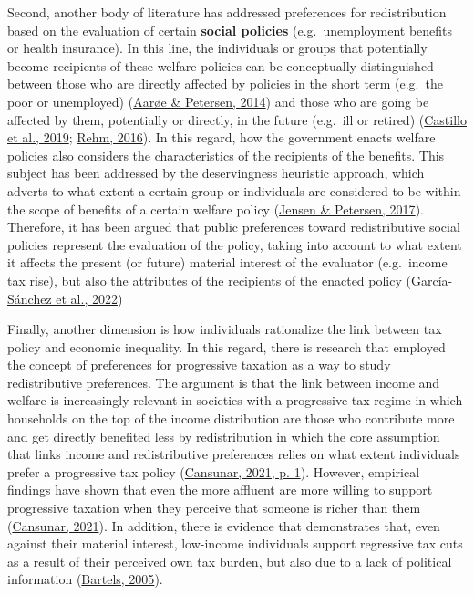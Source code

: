 \documentclass[
  12pt,
]{book}
\begin{document}
Second, another body of literature has addressed preferences for redistribution based on the evaluation of certain \textbf{social policies} (e.g.~unemployment benefits or health insurance). In this line, the individuals or groups that potentially become recipients of these welfare policies can be conceptually distinguished between those who are directly affected by policies in the short term (e.g.~the poor or unemployed) (\protect\hyperlink{ref-Aaroe2014}{Aarøe \& Petersen, 2014}) and those who are going be affected by them, potentially or directly, in the future (e.g.~ill or retired) (\protect\hyperlink{ref-castillo_deserving_2019}{Castillo et al., 2019}; \protect\hyperlink{ref-rehm_risk_2016}{Rehm, 2016}). In this regard, how the government enacts welfare policies also considers the characteristics of the recipients of the benefits. This subject has been addressed by the deservingness heuristic approach, which adverts to what extent a certain group or individuals are considered to be within the scope of benefits of a certain welfare policy (\protect\hyperlink{ref-Jensen2017}{Jensen \& Petersen, 2017}). Therefore, it has been argued that public preferences toward redistributive social policies represent the evaluation of the policy, taking into account to what extent it affects the present (or future) material interest of the evaluator (e.g.~income tax rise), but also the attributes of the recipients of the enacted policy (\protect\hyperlink{ref-garcia-sanchez_two_2022}{García-Sánchez et al., 2022})

Finally, another dimension is how individuals rationalize the link between tax policy and economic inequality. In this regard, there is research that employed the concept of preferences for progressive taxation as a way to study redistributive preferences. The argument is that the link between income and welfare is increasingly relevant in societies with a progressive tax regime in which households on the top of the income distribution are those who contribute more and get directly benefited less by redistribution in which the core assumption that links income and redistributive preferences relies on what extent individuals prefer a progressive tax policy (\protect\hyperlink{ref-cansunar_who_2021}{Cansunar, 2021, p. 1}). However, empirical findings have shown that even the more affluent are more willing to support progressive taxation when they perceive that someone is richer than them (\protect\hyperlink{ref-cansunar_who_2021}{Cansunar, 2021}). In addition, there is evidence that demonstrates that, even against their material interest, low-income individuals support regressive tax cuts as a result of their perceived own tax burden, but also due to a lack of political information (\protect\hyperlink{ref-bartels_homer_2005}{Bartels, 2005}).
\end{document}
